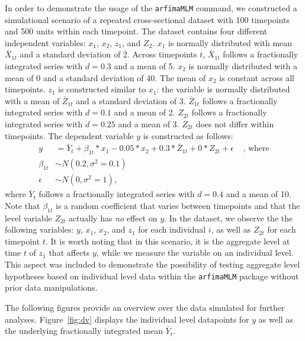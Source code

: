 \documentclass[12pt]{paper}\usepackage[]{graphicx}\usepackage[]{color}
\begin{document}
In order to demonstrate the usage of the \texttt{arfimaMLM} command, we constructed a simulational scenario of a repeated cross-sectional dataset with 100 timepoints and 500 units within each timepoint. The dataset contains four different independent variables: $x_1$, $x_2$, $z_1$, and $Z_2$. $x_1$ is normally distributed with mean $\bar{X}_{1t}$ and a standard deviation of 2. Across timepoints $t$, $\bar{X}_{1t}$ follows a fractionally integrated series with $d=0.3$ and a mean of 5. $x_2$ is normally distributed with a mean of 0 and a standard deviation of 40. The mean of $x_2$ is constant across all timepoints. $z_1$ is constructed similar to $x_1$: the variable is normally distributed with a mean of $\bar{Z}_{1t}$ and a standard deviation of 3. $\bar{Z}_{1t}$ follows a fractionally integrated series with $d=0.1$ and a mean of 2. $Z_{2t}$ follows a fractionally integrated series with $d=0.25$ and a mean of 3. $Z_{2t}$ does not differ within timepoints. The dependent variable $y$ is constructed as follows:
\begin{align}
y &=\bar{Y}_t+\beta_{1t} * x_1 - 0.05 * x_2 + 0.3 * \bar{Z}_{1t} + 0 * Z_{2t} + \epsilon &\text{ , where} \nonumber \\
\beta_{1t} &\sim N(0.2,\sigma^2=0.1) & \nonumber \\
\epsilon &\sim N(0,\sigma^2=1), &
\end{align}
where $\bar{Y}_t$ follows a fractionally integrated series with $d=0.4$ and a mean of 10. Note that $\beta_{1t}$ is a random coefficient that varies between timepoints and that the level variable $Z_{2t}$ actually has \textit{no} effect on $y$. In the dataset, we observe the the following variables: $y$, $x_1$, $x_2$, and $z_1$ for each individual $i$, as well as $Z_{2t}$ for each timepoint $t$. It is worth noting that in this scenario, it is the aggregate level at time $t$ of $z_1$ that affects $y$, while we measure the variable on an individual level. This aspect was included to demonstrate the possibility of testing aggregate level hypotheses based on individual level data within the \texttt{arfimaMLM} package without prior data manipulations.

The following figures provide an overview over the data simulated for further analyses. Figure~\ref{fig:dv} displays the individual level datapoints for $y$ as well as the underlying fractionally integrated mean $\bar{Y}_t$.
\end{document}
